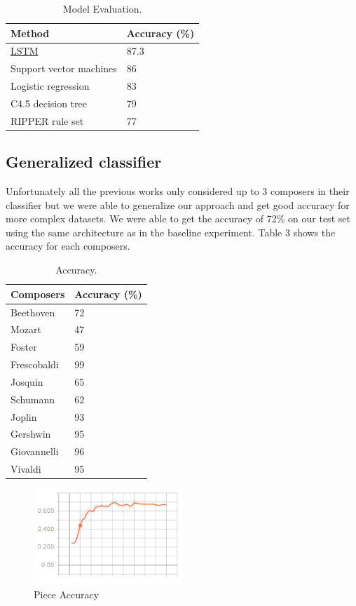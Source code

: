 \documentclass[11pt,a4paper]{article}
\begin{document}
\begin{table}[t!]
\begin{center}
\begin{tabular}{|l|l|}
\hline \bf Method & \bf Accuracy (\%) \\ \hline
\underline{LSTM} & 87.3 \\
Support vector machines & 86 \\
Logistic regression & 83\\
C4.5 decision tree & 79\\
RIPPER rule set & 77\\
\hline
\end{tabular}
\end{center}
\caption{\label{resutls-table} Model Evaluation. }
\end{table}

\subsection{Generalized classifier}
Unfortunately all the previous works only considered up to 3 composers in their classifier but we were able to generalize our approach and get good accuracy for more complex datasets. We were able to get the accuracy of 72\% on our test set using the same architecture as in the baseline experiment. Table 3 shows the accuracy for each composers. 
\begin{table}[t!]
\begin{center}
\begin{tabular}{|l|l|}
\hline \bf Composers & \bf Accuracy (\%)\\ \hline
Beethoven & 72 \\
Mozart & 47\\
Foster & 59\\
Frescobaldi & 99\\
Josquin & 65\\
Schumann & 62\\
Joplin & 93\\
Gershwin & 95\\
Giovannelli & 96\\
Vivaldi & 95  \\
\hline
\end{tabular}
\end{center}
\caption{\label{test-accuracy-table}Accuracy. }
\end{table}

\begin{figure}[h]
\caption{Piece Accuracy}
\centering
\includegraphics[width=0.5\textwidth]{Gaccuracy.png}
\end{figure}
\end{document}
